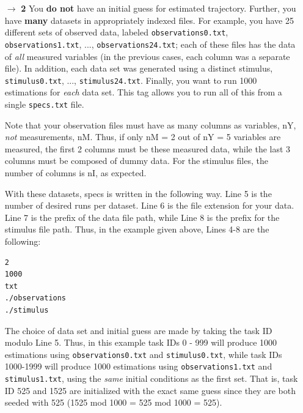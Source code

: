 \documentclass[11pt]{article}
\begin{document}
{\begin{itemize}
The initial guess file is written in Line 5 of \texttt{specs.txt}. The following nM + nI lines are for the observation and stimulus data file paths, as in the previous case. For example:

\begin{verbatim}
1
./initialization.dat
./measuredVoltage.dat
./measuredCa.dat
./injectedCurrent.dat
\end{verbatim}


\item[$\rightarrow$] {\bf 2} You {\bf do not} have an initial guess for estimated trajectory. Further, you have {\bf many} datasets in appropriately indexed files. For example, you have 25 different sets of observed data, labeled \texttt{observations0.txt}, \texttt{observations1.txt}, ..., \texttt{observations24.txt}; each of these files has the data of {\it all} measured variables (in the previous cases, each column was a separate file). In addition, each data set was generated using a distinct stimulus, \texttt{stimulus0.txt}, ..., \texttt{stimulus24.txt}. Finally, you want to run 1000 estimations for {\it each} data set. This tag allows you to run all of this from a single \texttt{specs.txt} file. 

Note that your observation files must have as many columns as variables, nY, {\it not} measurements, nM. Thus, if only nM = 2 out of nY = 5 variables are measured, the first 2 columns must be these measured data, while the last 3 columns must be composed of dummy data. For the stimulus files, the number of columns is nI, as expected. 

With these datasets, specs is written in the following way. Line 5 is the number of desired runs per dataset. Line 6 is the file extension for your data. Line 7 is the prefix of the data file path, while  Line 8 is the prefix for the stimulus file path. Thus, in the example given above, Lines 4-8 are the following:

\begin{verbatim}
2 
1000 
txt 
./observations 
./stimulus  
\end{verbatim}

The choice of data set and initial guess are made by taking the task ID modulo Line 5. Thus, in this example task IDs 0 - 999 will produce 1000 estimations using \texttt{observations0.txt} and \texttt{stimulus0.txt}, while task IDs 1000-1999 will produce 1000 estimations using \texttt{observations1.txt} and \texttt{stimulus1.txt}, using the {\it same} initial conditions as the first set. That is, task ID 525 and 1525 are initialized with the exact same guess since they are both seeded with 525 (1525 mod 1000 = 525 mod 1000 = 525). 


\end{itemize}}
\end{document}
